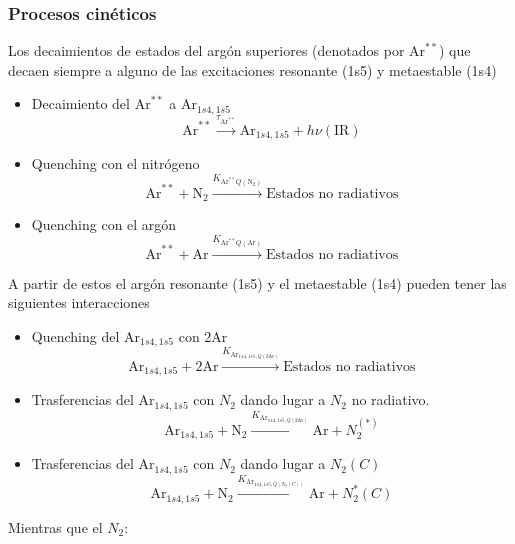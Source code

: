 \documentclass[12pt,a4paper]{article}
\newcommand{\N}{\mathrm{N}}
\newcommand{\Ar}{\mathrm{Ar}}
\begin{document}
\subsubsection{Procesos cinéticos}

Los decaimientos de estados del argón superiores (denotados por $\Ar^{**}$) que decaen siempre a alguno de las excitaciones resonante (1s5) y metaestable (1s4)

\begin{itemize}
    \item Decaimiento del $\Ar^{**}$ a $\Ar_{1s4,1s5}$
    \begin{equation}
        \Ar^{**} 
        \xrightarrow{\tau_{\Ar^{**}}}  \Ar_{1s4,1s5} + h \nu (\text{IR})
    \end{equation}
    \item Quenching con el nitrógeno
    \begin{equation}
        \Ar^{**} + \N_2
        \xrightarrow{K_{\Ar^{**}Q(\N_2)}}  \text{Estados no radiativos}
    \end{equation}
    \item Quenching con el argón
    \begin{equation}
        \Ar^{**} + \Ar
        \xrightarrow{K_{\Ar^{**}Q(\Ar)}}  \text{Estados no radiativos}
    \end{equation}
\end{itemize}


A partir de estos el argón resonante (1s5) y el metaestable (1s4) pueden tener las siguientes interacciones

\begin{itemize}
    \item Quenching del $\Ar_{1s4,1s5}$ con 2$\Ar$
    \begin{equation}
        \Ar_{1s4,1s5} + 2 \Ar
        \xrightarrow{K_{\Ar_{1s4,1s5,Q(2\Ar)}}}  \text{Estados no radiativos}
    \end{equation}

    \item Trasferencias del $\Ar_{1s4,1s5}$ con $N_2$ dando lugar a $N_2$ no radiativo.
    \begin{equation}
        \Ar_{1s4,1s5} + \N_2
        \xrightarrow{K_{\Ar_{1s4,1s5,Q(2\Ar)}}}  \Ar + N_2^{(*)}
    \end{equation}
    
    \item Trasferencias del $\Ar_{1s4,1s5}$ con $N_2$ dando lugar a $N_2(C)$
    \begin{equation}
        \Ar_{1s4,1s5} + \N_2
        \xrightarrow{K_{\Ar_{1s4,1s5,Q(N_2(C))}}}  \Ar + N_2^*(C)
    \end{equation}
\end{itemize}
Mientras que el $N_2$: 
\end{document}
